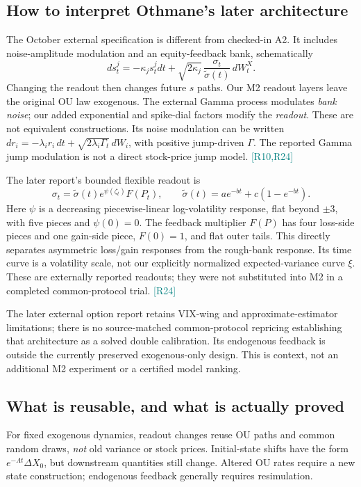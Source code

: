 \documentclass[11pt,a4paper]{article}
\newcommand{\src}[1]{\textcolor{teal}{\small[#1]}}
\begin{document}
\subsection{How to interpret Othmane's later architecture}
The October external specification is different from checked-in A2. It includes noise-amplitude modulation and an equity-feedback bank, schematically
\begin{equation}
ds_t^j=-\kappa_js_t^jdt+\sqrt{2\kappa_j}\,
\frac{\sigma_t}{\widetilde\sigma(t)}\,dW_t^X.
\end{equation}
Changing the readout then changes future $s$ paths. Our M2 readout layers leave the original OU law exogenous. The external Gamma process modulates \emph{bank noise}; our added exponential and spike-dial factors modify the \emph{readout}. These are not equivalent constructions. Its noise modulation can be written $dr_i=-\lambda_i r_i\,dt+\sqrt{2\lambda_i\Gamma_t}\,dW_i$, with positive jump-driven $\Gamma$. The reported Gamma jump modulation is not a direct stock-price jump model. \src{R10,R24}

The later report's bounded flexible readout is
\begin{equation}
\sigma_t=\widetilde\sigma(t)e^{\psi(\zeta_t)}F(P_t),\qquad
\widetilde\sigma(t)=a e^{-bt}+c(1-e^{-bt}).
\end{equation}
Here $\psi$ is a decreasing piecewise-linear log-volatility response, flat beyond $\pm3$, with five pieces and $\psi(0)=0$. The feedback multiplier $F(P)$ has four loss-side pieces and one gain-side piece, $F(0)=1$, and flat outer tails. This directly separates asymmetric loss/gain responses from the rough-bank response. Its time curve is a volatility scale, not our explicitly normalized expected-variance curve $\xi$. These are externally reported readouts; they were not substituted into M2 in a completed common-protocol trial. \src{R24}

The later external option report retains VIX-wing and approximate-estimator limitations; there is no source-matched common-protocol repricing establishing that architecture as a solved double calibration. Its endogenous feedback is outside the currently preserved exogenous-only design. This is context, not an additional M2 experiment or a certified model ranking.

\subsection{What is reusable, and what is actually proved}
For fixed exogenous dynamics, readout changes reuse OU paths and common random draws, \emph{not} old variance or stock prices. Initial-state shifts have the form $e^{-\Lambda t}\Delta X_0$, but downstream quantities still change. Altered OU rates require a new state construction; endogenous feedback generally requires resimulation.
\end{document}
